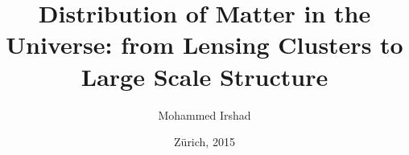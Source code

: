 


\title{Distribution of Matter in the Universe: from Lensing Clusters
to  Large Scale Structure}

\author{Mohammed Irshad}






\date{Z\"urich, 2015}

